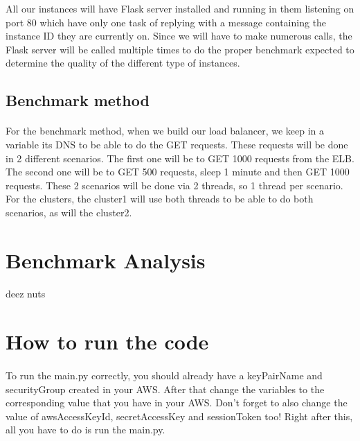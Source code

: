 \documentclass[12pt]{article}
\begin{document}
		All our instances will have Flask server installed and running in them listening on port 80 which have only one task of replying
		with a message containing the instance ID they are currently on. Since we will have to make numerous calls, the Flask server 
		will be called multiple times to do the proper benchmark expected to determine the quality of the different type of instances.
		\bigskip

	\subsection{Benchmark method}
		\paragraph{} For the benchmark method, when we build our load balancer, we keep in a variable its DNS to be able to do the GET requests.
		These requests will be done in 2 different scenarios. The first one will be to GET 1000 requests from the ELB. The second one will be to 
		GET 500 requests, sleep 1 minute and then GET 1000 requests. These 2 scenarios will be done via 2 threads, so 1 thread per scenario. For 
		the clusters, the cluster1 will use both threads to be able to do both scenarios, as will the cluster2.
		\bigskip
		\pagebreak

\section{Benchmark Analysis} \label{sec:benchmark}
	\paragraph{} deez nuts

	\pagebreak

	
\section{How to run the code} \label{sec:runcode}
	\paragraph{} To run the main.py correctly, you should already have a keyPairName and securityGroup created in your AWS. After that 
	change the variables to the corresponding value that you have in your AWS. Don't forget to also change the value
	of awsAccessKeyId, secretAccessKey and sessionToken too! Right after this, all you have to do is run the main.py.
	\bigskip
\end{document}
